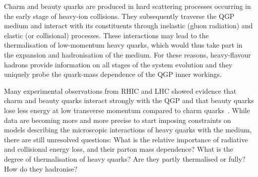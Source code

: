 Charm and beauty quarks are produced in hard scattering processes occurring in the early stage of heavy-ion collisions. They subsequently traverse the QGP medium and interact with its constituents through inelastic (gluon radiation) and elastic (or collisional) processes.
These interactions may lead to the thermalisation of low-momentum heavy quarks, which would thus take part in the expansion and hadronisation of the medium.
For these reasons, heavy-flavour hadrons provide information on all stages of the system evolution and they uniquely probe the quark-mass dependence of the QGP inner workings.

Many experimental observations from RHIC and LHC showed evidence that charm and beauty quarks interact strongly with the QGP and that beauty quarks lose less energy at low transverse momentum compared to charm quarks~\cite{Adam:2015nna,Khachatryan:2016ypw}. 
While data are becoming more and more precise to start imposing constraints on models describing the microscopic interactions of heavy quarks with the medium, there are still unresolved questions:  What is the relative importance of radiative and collisional energy loss, and their parton mass dependence? What is the degree of thermalisation of heavy quarks? Are they partly thermalised or fully? How do they hadronise? 

